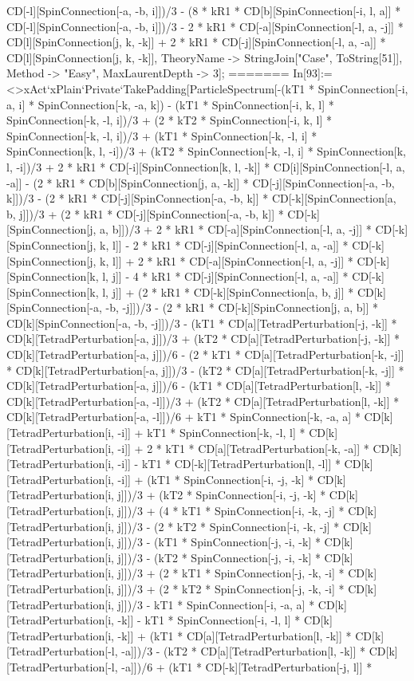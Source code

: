 CD[-l][SpinConnection[-a, -b, i]])/3 - (8 * kR1 * CD[b][SpinConnection[-i, l, a]] * CD[-l][SpinConnection[-a, -b, i]])/3 - 2 * kR1 * CD[-a][SpinConnection[-l, a, -j]] * CD[l][SpinConnection[j, k, -k]] + 2 * kR1 * CD[-j][SpinConnection[-l, a, -a]] * CD[l][SpinConnection[j, k, -k]], TheoryName -> StringJoin["Case", ToString[51]], Method -> "Easy", MaxLaurentDepth -> 3]; 
=======
In[93]:= <>xAct`xPlain`Private`TakePadding[ParticleSpectrum[-(kT1 * SpinConnection[-i, a, i] * SpinConnection[-k, -a, k]) - (kT1 * SpinConnection[-i, k, l] * SpinConnection[-k, -l, i])/3 + (2 * kT2 * SpinConnection[-i, k, l] * SpinConnection[-k, -l, i])/3 + (kT1 * SpinConnection[-k, -l, i] * SpinConnection[k, l, -i])/3 + (kT2 * SpinConnection[-k, -l, i] * SpinConnection[k, l, -i])/3 + 2 * kR1 * CD[-i][SpinConnection[k, l, -k]] * CD[i][SpinConnection[-l, a, -a]] - (2 * kR1 * CD[b][SpinConnection[j, a, -k]] * CD[-j][SpinConnection[-a, -b, k]])/3 - (2 * kR1 * CD[-j][SpinConnection[-a, -b, k]] * CD[-k][SpinConnection[a, b, j]])/3 + (2 * kR1 * CD[-j][SpinConnection[-a, -b, k]] * CD[-k][SpinConnection[j, a, b]])/3 + 2 * kR1 * CD[-a][SpinConnection[-l, a, -j]] * CD[-k][SpinConnection[j, k, l]] - 2 * kR1 * CD[-j][SpinConnection[-l, a, -a]] * CD[-k][SpinConnection[j, k, l]] + 2 * kR1 * CD[-a][SpinConnection[-l, a, -j]] * CD[-k][SpinConnection[k, l, j]] - 4 * kR1 * CD[-j][SpinConnection[-l, a, -a]] * CD[-k][SpinConnection[k, l, j]] + (2 * kR1 * CD[-k][SpinConnection[a, b, j]] * CD[k][SpinConnection[-a, -b, -j]])/3 - (2 * kR1 * CD[-k][SpinConnection[j, a, b]] * CD[k][SpinConnection[-a, -b, -j]])/3 - (kT1 * CD[a][TetradPerturbation[-j, -k]] * CD[k][TetradPerturbation[-a, j]])/3 + (kT2 * CD[a][TetradPerturbation[-j, -k]] * CD[k][TetradPerturbation[-a, j]])/6 - (2 * kT1 * CD[a][TetradPerturbation[-k, -j]] * CD[k][TetradPerturbation[-a, j]])/3 - (kT2 * CD[a][TetradPerturbation[-k, -j]] * CD[k][TetradPerturbation[-a, j]])/6 - (kT1 * CD[a][TetradPerturbation[l, -k]] * CD[k][TetradPerturbation[-a, -l]])/3 + (kT2 * CD[a][TetradPerturbation[l, -k]] * CD[k][TetradPerturbation[-a, -l]])/6 + kT1 * SpinConnection[-k, -a, a] * CD[k][TetradPerturbation[i, -i]] + kT1 * SpinConnection[-k, -l, l] * CD[k][TetradPerturbation[i, -i]] + 2 * kT1 * CD[a][TetradPerturbation[-k, -a]] * CD[k][TetradPerturbation[i, -i]] - kT1 * CD[-k][TetradPerturbation[l, -l]] * CD[k][TetradPerturbation[i, -i]] + (kT1 * SpinConnection[-i, -j, -k] * CD[k][TetradPerturbation[i, j]])/3 + (kT2 * SpinConnection[-i, -j, -k] * CD[k][TetradPerturbation[i, j]])/3 + (4 * kT1 * SpinConnection[-i, -k, -j] * CD[k][TetradPerturbation[i, j]])/3 - (2 * kT2 * SpinConnection[-i, -k, -j] * CD[k][TetradPerturbation[i, j]])/3 - (kT1 * SpinConnection[-j, -i, -k] * CD[k][TetradPerturbation[i, j]])/3 - (kT2 * SpinConnection[-j, -i, -k] * CD[k][TetradPerturbation[i, j]])/3 + (2 * kT1 * SpinConnection[-j, -k, -i] * CD[k][TetradPerturbation[i, j]])/3 + (2 * kT2 * SpinConnection[-j, -k, -i] * CD[k][TetradPerturbation[i, j]])/3 - kT1 * SpinConnection[-i, -a, a] * CD[k][TetradPerturbation[i, -k]] - kT1 * SpinConnection[-i, -l, l] * CD[k][TetradPerturbation[i, -k]] + (kT1 * CD[a][TetradPerturbation[l, -k]] * CD[k][TetradPerturbation[-l, -a]])/3 - (kT2 * CD[a][TetradPerturbation[l, -k]] * CD[k][TetradPerturbation[-l, -a]])/6 + (kT1 * CD[-k][TetradPerturbation[-j, l]] * 